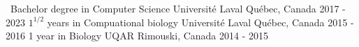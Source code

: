 


\begin{cventries}


\cventry
{\ Bachelor degree in Computer Science} %
{Université Laval} %
{Québec, Canada} %
{2017 - 2023} %
{ %
}
\cventry
{$1^{1/2}$ years in Compuational biology} %
{Université Laval} %
{Québec, Canada} %
{2015 - 2016} %
{ %
}
\cventry
{1 year in Biology} %
{UQAR} %
{Rimouski, Canada} %
{2014 - 2015} %
{ %
}

\end{cventries}
